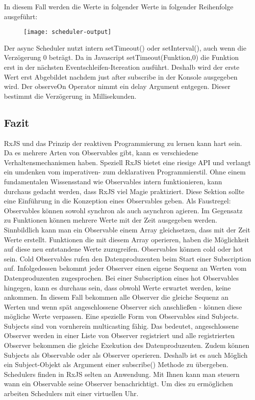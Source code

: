 \noindent
In diesem Fall werden die Werte in folgender Werte in folgender Reihenfolge ausgeführt:

\begin{figure}[H]
\centering
\texttt{[image: scheduler-output]}
\end{figure}

\noindent
Der async Scheduler nutzt intern setTimeout() oder setInterval(), auch wenn die Verzögerung 0 beträgt. Da in Javascript setTimeout(Funktion,0) die Funktion erst in der nächsten Eventschleifen-Itereation ausführt. Deshalb wird der erste Wert erst Abgebildet nachdem \glqq just after subscribe\grqq{} in der Konsole ausgegeben wird. Der observeOn Operator nimmt ein delay Argument entgegen. Dieser bestimmt die Verzögerung in Millisekunden.


\subsection{Fazit}
RxJS und das Prinzip der reaktiven Programmierung zu lernen kann hart sein. Da es mehrere Arten von Observables gibt, kann es verschiedene Verhaltensmechanismen haben. Speziell RxJS bietet eine riesige API und verlangt ein umdenken vom imperativen- zum deklarativen Programmierstil. Ohne einem fundamentalen Wissensstand wie Observables intern funktionieren, kann durchaus gedacht werden, dass RxJS viel \glqq Magie\grqq{} praktiziert. Diese Sektion sollte eine Einführung in die Konzeption eines Observables geben. Als Faustregel: Observables können sowohl synchron als auch asynchron agieren. Im Gegensatz zu Funktionen können mehrere Werte mit der Zeit ausgegeben werden. Sinnbildlich kann man ein Observable einem Array gleichsetzen, dass mit der Zeit Werte erstellt. Funktionen die mit diesem Array operieren, haben die Möglichkeit auf diese neu entstandene Werte zuzugreifen. Observables können cold oder hot sein. Cold Observables rufen den Datenproduzenten beim Start einer Subscription auf. Infolgedessen bekommt jeder Observer einen eigene Sequenz an Werten vom Datenproduzenten zugesprochen. Bei einer Subscription eines hot Observables hingegen, kann es durchaus sein, dass obwohl Werte erwartet werden, keine ankommen. In diesem Fall bekommen alle Observer die gleiche Sequenz an Werten und wenn spät angeschlossene Observer sich anschließen - können diese mögliche Werte verpassen. Eine spezielle Form von Observables sind Subjects. Subjects sind von vornherein multicasting fähig. Das bedeutet, angeschlossene Observer werden in einer Liste von Observer registriert und alle registrierten Observer bekommen die gleiche Exekution des Datenproduzenten. Zudem können Subjects als Observable oder als Observer operieren. Deshalb ist es auch Möglich ein Subject-Objekt als Argument einer subscribe() Methode zu übergeben. Schedulers finden in RxJS selten an Anwendung. Mit Ihnen kann man steuern wann ein Observable seine Observer benachrichtigt. Um dies zu ermöglichen arbeiten Schedulers mit einer virtuellen Uhr.

